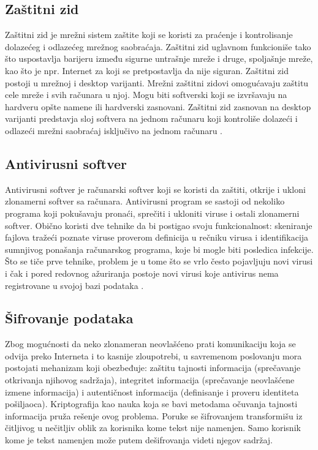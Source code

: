 \documentclass[a4paper]{article}
\begin{document}
\subsection{Zaštitni zid}
\label{subsec:zastitni zid}

Zaštitni zid je mrežni sistem zaštite koji se koristi za praćenje i kontrolisanje dolazećeg i odlazećeg mrežnog saobraćaja. Zaštitni zid uglavnom funkcioniše tako što uspostavlja barijeru između sigurne untrašnje mreže i druge, spoljašnje mreže, kao što je npr. Internet za koji se pretpostavlja da nije siguran.
Zaštitni zid postoji u mrežnoj i desktop varijanti. Mrežni zaštitni zidovi omogućavaju zaštitu cele mreže i svih računara u njoj. Mogu biti softverski koji se izvršavaju na hardveru opšte namene ili hardverski zasnovani.
Zaštitni zid zasnovan na desktop varijanti predstavja sloj softvera na jednom računaru koji kontroliše dolazeći i odlazeći mrežni saobraćaj isključivo na jednom računaru \cite{firewalls}.

\subsection{Antivirusni softver}
\label{subsec:antivirusni softver}

Antivirusni softver je računarski softver koji se koristi da zaštiti, otkrije i ukloni zlonamerni softver sa računara.
Antivirusni program se sastoji od nekoliko programa koji pokušavaju pronaći, sprečiti i ukloniti viruse i ostali zlonamerni softver. Obično koristi dve tehnike da bi postigao svoju funkcionalnost: skeniranje fajlova tražeći poznate viruse proverom definicija u rečniku virusa i identifikacija sumnjivog ponašanja računarskog programa, koje bi mogle biti posledica infekcije. Što se tiče prve tehnike, problem je u tome što se vrlo često pojavljuju novi virusi i čak i pored redovnog ažuriranja postoje novi virusi koje antivirus nema registrovane u svojoj bazi podataka \cite{antivirus}.

\subsection{Šifrovanje podataka}
\label{subsec:sifrovanje podataka}

Zbog mogućnosti da neko zlonameran neovlašćeno prati komunikaciju koja se odvija preko Interneta i to kasnije zloupotrebi, u savremenom poslovanju mora postojati mehanizam koji obezbeđuje:  zaštitu tajnosti informacija (sprečavanje otkrivanja njihovog sadržaja),  integritet informacija (sprečavanje neovlašćene izmene informacija) i autentičnost informacija (definisanje i proveru identiteta pošiljaoca). Kriptografija kao nauka koja se bavi metodama očuvanja tajnosti informacija pruža rešenje ovog problema. Poruke se šifrovanjem transformišu iz čitljivog u nečitljiv oblik za korisnika kome tekst nije namenjen. Samo korisnik kome je tekst namenjen može putem dešifrovanja videti njegov sadržaj.
\end{document}
